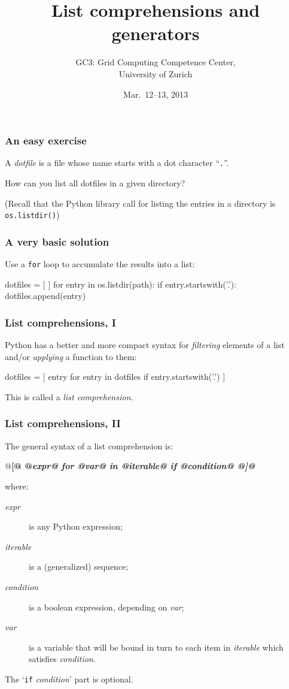 \documentclass[english,serif,mathserif,xcolor=pdftex,dvipsnames,table]{beamer}
\title[Part 7]{%
  List comprehensions and generators
}
\author[GC3]{%
  GC3: Grid Computing Competence Center, \\
  University of Zurich
}
\date{Mar.~12--13, 2013}
\begin{document}
\maketitle


\begin{frame}
  \frametitle{An easy exercise}
  A \emph{dotfile} is a file whose name starts with a dot character
  ``\texttt{.}''.

  \+
  How can you list all dotfiles in a given directory?

  \+
  (Recall that the Python library call for listing the entries in a
  directory is \texttt{os.listdir()})
\end{frame}


\begin{frame}[fragile]
  \frametitle{A very basic solution}
  Use a \lstinline|for| loop to accumulate the results into a list:
  \begin{python}
dotfiles = [ ]
for entry in os.listdir(path):
  if entry.startswith('.'):
    dotfiles.append(entry)
  \end{python}
\end{frame}


\begin{frame}[fragile]
  \frametitle{List comprehensions, I}
  Python has a better and more compact syntax for \emph{filtering} elements
  of a list and/or \emph{applying} a function to them:
  \begin{python}
dotfiles = [ entry for entry in dotfiles 
             if entry.startswith('.') ]
  \end{python}
  
  \+ 
  This is called a \emph{list comprehension}.
\end{frame}


\begin{frame}[fragile]
  \frametitle{List comprehensions, II}
  \def\e{\ttfamily\itshape}
  
  The general syntax of a list comprehension is:
  \begin{python}
    @\bf[@ @\e expr@ for @\e var@ in @\e iterable@ if @\e condition@ @\bf]@
  \end{python}
  where:
  \begin{description}
  \item[\e expr] is any Python expression;
  \item[\e iterable] is a (generalized) sequence;
  \item[\e condition] is a boolean expression, depending on
    {\e var};
  \item[\e var] is a variable that will be bound in turn to each item
    in {\e iterable} which satisfies {\e condition}.
  \end{description}

  \+
  The `{\lstinline|if| \e condition}' part is optional.
\end{frame}
\end{document}
